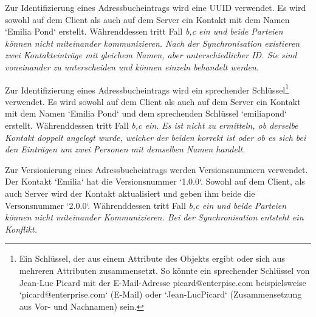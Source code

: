 %
%
\def \naturalkey {Ein Schlüssel, der aus einem Attribute des Objekts ergibt oder sich aus mehreren Attributen zusammensetzt. So könnte ein sprechender Schlüssel von Jean-Luc Picard mit der E-Mail-Adresse picard@enterpise.com beispielsweise `picard@enterprise.com` (E-Mail) oder `Jean-LucPicard` (Zusammensetzung aus Vor- und Nachnamen) sein.}
\def \logicalclock {Eine Logische Uhr ist eine Komponente die dazu dient, dem Datenobjekt einen eindeutigen Zeitstempel zuzuweisen. die bekanntesten Verfahren für Logische Uhren in verteilten Systemen sind die Lamport-Uhr und die Vektoruhr. Beide verwenden Zähler die sich bei jedem Ereignis erhöhen. Einfach gesagt besteht die Lamport-Uhr aus einem Zeitstempel und einem Zähler, die Vektoruhr aus einem Zeitstempel und einem Vektor -- einer Liste aus Zählern.}
%
%
\begin{description}[leftmargin=0.5cm,style=nextline]
  \item[Szenario ID0:]
  Zur Identifizierung eines Adressbucheintrags wird eine \gls{UUID} verwendet. Es wird sowohl auf dem Client als auch auf dem Server ein Kontakt mit dem Namen `Emilia Pond` erstellt. Währenddessen tritt Fall \it{b,c} ein und beide Parteien können nicht miteinander kommunizieren. Nach der Synchronisation existieren zwei Kontakteinträge mit gleichem Namen, aber unterschiedlicher ID. Sie sind voneinander zu unterscheiden und können einzeln behandelt werden.\\
  \item[Szenario ID1:]
  Zur Identifizierung eines Adressbucheintrags wird ein sprechender Schlüssel\footnote{\naturalkey} verwendet.
  Es wird sowohl auf dem Client als auch auf dem Server ein Kontakt mit dem Namen `Emilia Pond` und dem sprechenden Schlüssel `emiliapond` erstellt. Währenddessen tritt Fall \it{b,c} ein. Es ist nicht zu ermitteln, ob derselbe Kontakt doppelt angelegt wurde, welcher der beiden korrekt ist oder ob es sich bei den Einträgen um zwei Personen mit demselben Namen handelt.\\
  \item[Szenario V0:]
  Zur Versionierung eines Adressbucheintrags werden Versionsnummern verwendet. Der Kontakt `Emilia` hat die Versionsnummer `1.0.0`. Sowohl auf dem Client, als auch Server wird der Kontakt aktualisiert und geben ihm beide die Versonsnummer `2.0.0`. Währenddessen tritt Fall \it{b,c} ein und beide Parteien können nicht miteinander Kommunizieren. Bei der Synchronisation entsteht ein Konflikt.\\
  \item[Szenario V1:]%

\end{description}
